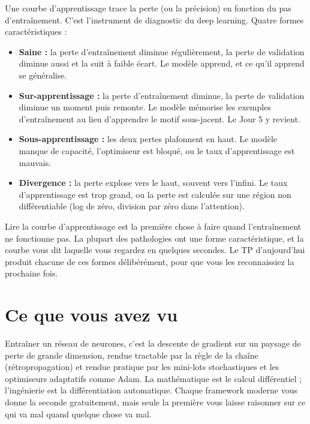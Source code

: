 Une courbe d'apprentissage trace la perte (ou la précision) en fonction du pas d'entraînement. C'est l'instrument de diagnostic du deep learning. Quatre formes caractéristiques :

\begin{itemize}
  \item \textbf{Saine :} la perte d'entraînement diminue régulièrement, la perte de validation diminue aussi et la suit à faible écart. Le modèle apprend, et ce qu'il apprend se généralise.
  \item \textbf{Sur-apprentissage :} la perte d'entraînement diminue, la perte de validation diminue un moment puis remonte. Le modèle mémorise les exemples d'entraînement au lieu d'apprendre le motif sous-jacent. Le Jour 5 y revient.
  \item \textbf{Sous-apprentissage :} les deux pertes plafonnent en haut. Le modèle manque de capacité, l'optimiseur est bloqué, ou le taux d'apprentissage est mauvais.
  \item \textbf{Divergence :} la perte explose vers le haut, souvent vers l'infini. Le taux d'apprentissage est trop grand, ou la perte est calculée sur une région non différentiable (log de zéro, division par zéro dans l'attention).
\end{itemize}

\begin{intuition}
Lire la courbe d'apprentissage est la première chose à faire quand l'entraînement ne fonctionne pas. La plupart des pathologies ont une forme caractéristique, et la courbe vous dit laquelle vous regardez en quelques secondes. Le TP d'aujourd'hui produit chacune de ces formes délibérément, pour que vous les reconnaissiez la prochaine fois.
\end{intuition}

\section{Ce que vous avez vu}

Entraîner un réseau de neurones, c'est la descente de gradient sur un paysage de perte de grande dimension, rendue tractable par la règle de la chaîne (rétropropagation) et rendue pratique par les mini-lots stochastiques et les optimiseurs adaptatifs comme Adam. La mathématique est le calcul différentiel ; l'ingénierie est la différentiation automatique. Chaque framework moderne vous donne la seconde gratuitement, mais seule la première vous laisse raisonner sur ce qui va mal quand quelque chose va mal.

